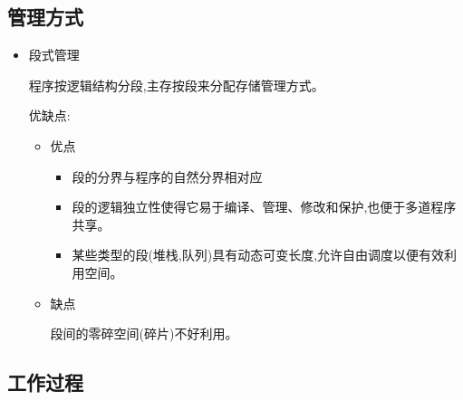 \documentclass[UTF8,a4paper]{ctexart}%
\begin{document}
      \subsection{管理方式}
          \begin{itemize}
            \item 段式管理

                程序按逻辑结构分段,主存按段来分配存储管理方式。


                优缺点:
                \begin{itemize}
                  \item 优点

                      \begin{itemize}
                        \item 段的分界与程序的自然分界相对应
                        \item 段的逻辑独立性使得它易于编译、管理、修改和保护,也便于多道程序共享。
                        \item 某些类型的段(堆栈,队列)具有动态可变长度,允许自由调度以便有效利用空间。

                      \end{itemize}

                  \item 缺点

                      段间的零碎空间(碎片)不好利用。

                \end{itemize}
          \end{itemize}
      \subsection{工作过程}
\end{document}
